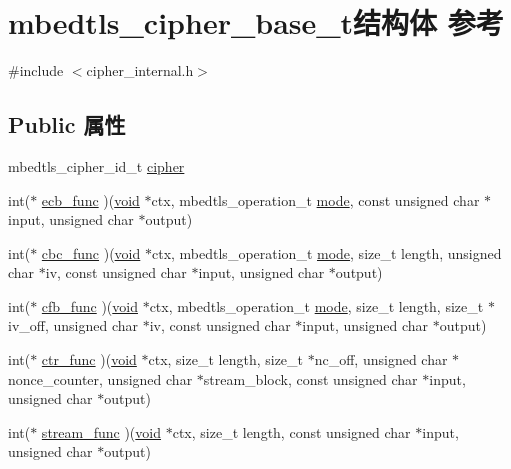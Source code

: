 \hypertarget{structmbedtls__cipher__base__t}{}\section{mbedtls\+\_\+cipher\+\_\+base\+\_\+t结构体 参考}
\label{structmbedtls__cipher__base__t}


{\ttfamily \#include $<$cipher\+\_\+internal.\+h$>$}

\subsection*{Public 属性}
\begin{DoxyCompactItemize}
\item 
mbedtls\+\_\+cipher\+\_\+id\+\_\+t \hyperlink{structmbedtls__cipher__base__t_a0c4c819c23b0a579445f92a4bee7d577}{cipher}
\item 
int($\ast$ \hyperlink{structmbedtls__cipher__base__t_ab57bc9b81dd43b63915b37ab56b0468d}{ecb\+\_\+func} )(\hyperlink{interfacevoid}{void} $\ast$ctx, mbedtls\+\_\+operation\+\_\+t \hyperlink{interfacevoid}{mode}, const unsigned char $\ast$input, unsigned char $\ast$output)
\item 
int($\ast$ \hyperlink{structmbedtls__cipher__base__t_a205924b0ffe7b35d4b74a7a4c6675ddf}{cbc\+\_\+func} )(\hyperlink{interfacevoid}{void} $\ast$ctx, mbedtls\+\_\+operation\+\_\+t \hyperlink{interfacevoid}{mode}, size\+\_\+t length, unsigned char $\ast$iv, const unsigned char $\ast$input, unsigned char $\ast$output)
\item 
int($\ast$ \hyperlink{structmbedtls__cipher__base__t_a06361a67ea8a128d3a58b4f99ee6cf5f}{cfb\+\_\+func} )(\hyperlink{interfacevoid}{void} $\ast$ctx, mbedtls\+\_\+operation\+\_\+t \hyperlink{interfacevoid}{mode}, size\+\_\+t length, size\+\_\+t $\ast$iv\+\_\+off, unsigned char $\ast$iv, const unsigned char $\ast$input, unsigned char $\ast$output)
\item 
int($\ast$ \hyperlink{structmbedtls__cipher__base__t_ac3d68fe4b133c56acb5b05029b8f60ea}{ctr\+\_\+func} )(\hyperlink{interfacevoid}{void} $\ast$ctx, size\+\_\+t length, size\+\_\+t $\ast$nc\+\_\+off, unsigned char $\ast$nonce\+\_\+counter, unsigned char $\ast$stream\+\_\+block, const unsigned char $\ast$input, unsigned char $\ast$output)
\item 
int($\ast$ \hyperlink{structmbedtls__cipher__base__t_a52099766d7c09f16e702d78b6819d9e9}{stream\+\_\+func} )(\hyperlink{interfacevoid}{void} $\ast$ctx, size\+\_\+t length, const unsigned char $\ast$input, unsigned char $\ast$output)

\end{DoxyCompactItemize}
